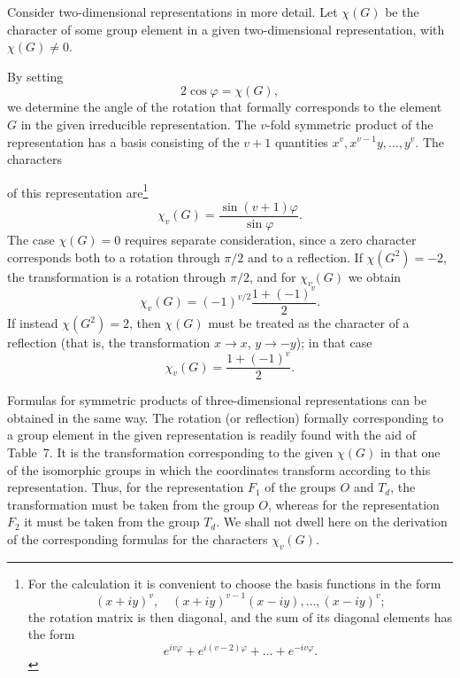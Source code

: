 Consider two-dimensional representations in more detail. Let $\chi(G)$ be the
character of some group element in a given two-dimensional representation,
with $\chi(G)\ne0$.

By setting
\begin{equation}
 2\cos\varphi=\chi(G),
 \tag{101.6}
\end{equation}
we determine the angle of the rotation that formally corresponds to the
element $G$ in the given irreducible representation. The $v$-fold symmetric
product of the representation has a basis consisting of the $v+1$ quantities
$x^v,x^{v-1}y,\ldots,y^v$. The characters

of this representation are\footnote{For the calculation it is convenient to
choose the basis functions in the form
\[
 (x+iy)^v,\quad (x+iy)^{v-1}(x-iy),\ldots,(x-iy)^v;
\]
the rotation matrix is then diagonal, and the sum of its diagonal elements
has the form
\[
 e^{iv\varphi}+e^{i(v-2)\varphi}+\ldots+e^{-iv\varphi}.
\]}
\begin{equation}
 \chi_v(G)=\frac{\sin(v+1)\varphi}{\sin\varphi}.
 \tag{101.7}
\end{equation}
The case $\chi(G)=0$ requires separate consideration, since a zero character
corresponds both to a rotation through $\pi/2$ and to a reflection. If
$\chi(G^2)=-2$, the transformation is a rotation through $\pi/2$, and for
$\chi_v(G)$ we obtain
\begin{equation}
 \chi_v(G)=(-1)^{v/2}\frac{1+(-1)^v}{2}.
 \tag{101.8}
\end{equation}
If instead $\chi(G^2)=2$, then $\chi(G)$ must be treated as the character of a
reflection (that is, the transformation $x\to x$, $y\to-y$); in that case
\begin{equation}
 \chi_v(G)=\frac{1+(-1)^v}{2}.
 \tag{101.9}
\end{equation}

Formulas for symmetric products of three-dimensional representations can be
obtained in the same way. The rotation (or reflection) formally corresponding
to a group element in the given representation is readily found with the aid
of Table~7. It is the transformation corresponding to the given $\chi(G)$ in
that one of the isomorphic groups in which the coordinates transform according
to this representation. Thus, for the representation $F_1$ of the groups $O$
and $T_d$, the transformation must be taken from the group $O$, whereas for
the representation $F_2$ it must be taken from the group $T_d$. We shall not
dwell here on the derivation of the corresponding formulas for the characters
$\chi_v(G)$.
